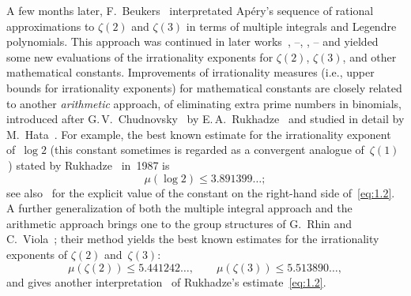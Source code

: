 \documentclass[a4paper,twoside]{article}
\numberwithin{equation}{section}
\renewcommand{\[}{\lfloor}
\renewcommand{\]}{\rfloor}
\newcommand{\<}{\langle}
\renewcommand{\>}{\rangle}
\begin{document}
A few months later,
F.~Beukers~\cite{Be} interpretated Ap\'ery's sequence
of rational approximations to $\zeta(2)$ and $\zeta(3)$
in terms of multiple integrals and Legendre polynomials.
This approach was continued in later
works~\cite{DV,Ru}, \cite{Ha1}--\cite{Ha5},
\cite{HMV}, \cite{RV1}--\cite{RV3}
and yielded some new evaluations of the irrationality exponents
for $\zeta(2)$, $\zeta(3)$, and other mathematical constants.
Improvements of irrationality measures (i.e., upper bounds for
irrationality exponents) for mathematical constants
are closely related to another {\it arithmetic\/} approach, of eliminating
extra prime numbers in binomials, introduced after G.\,V.~Chudnovsky~\cite{Ch}
by E.\,A.~Rukhadze~\cite{Ru} and studied in detail by M.~Hata~\cite{Ha1}.
For example, the best known estimate
for the irrationality exponent of~$\log2$
(this constant sometimes is regarded as a convergent
analogue of~$\zeta(1)$\,) stated by Rukhadze~\cite{Ru} in~1987 is
\begin{equation}
\mu(\log2)\le3.891399\dots;
\label{eq:1.2}
\end{equation}
see also~\cite{Ha1} for the explicit value of the constant
on the right-hand side of~\eqref{eq:1.2}.
A further generalization of both
the multiple integral approach and the arithmetic approach
brings one to the group structures of G.~Rhin and
C.~Viola~\cite{RV2,RV3}; their method yields
the best known estimates for the irrationality exponents
of $\zeta(2)$ and~$\zeta(3)$:
\begin{equation}
\mu(\zeta(2))\le5.441242\dots,
\qquad
\mu(\zeta(3))\le5.513890\dots,
\label{eq:1.3}
\end{equation}
and gives another interpretation~\cite{Vi}
of Rukhadze's estimate~\eqref{eq:1.2}.
\end{document}
